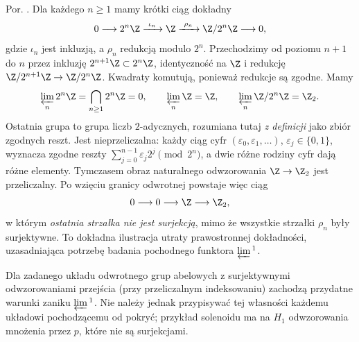 \begin{przyklad}
\label{prz:cech-lim-niedokladnosc}
Por. .
Dla każdego $n\ge1$ mamy krótki ciąg dokładny
\[
 0\longrightarrow 2^n\Z
 \xrightarrow{\ \iota_n\ }\Z
 \xrightarrow{\ \rho_n\ }\Z/2^n\Z
 \longrightarrow0,
\]
gdzie $\iota_n$ jest inkluzją, a $\rho_n$
redukcją modulo $2^n$.
Przechodzimy od poziomu $n+1$ do $n$ przez
inkluzję $2^{n+1}\Z\subset2^n\Z$,
identyczność na $\Z$ i redukcję
$\Z/2^{n+1}\Z\to\Z/2^n\Z$.
Kwadraty komutują, ponieważ redukcje są zgodne.
Mamy
\[
 \varprojlim_n2^n\Z=\bigcap_{n\ge1}2^n\Z=0,
 \qquad
 \varprojlim_n\Z=\Z,\qquad
 \varprojlim_n\Z/2^n\Z=\Z_2.
\]
Ostatnia grupa to grupa liczb $2$-adycznych,
rozumiana tutaj \emph{z definicji} jako zbiór
zgodnych reszt. Jest nieprzeliczalna:
każdy ciąg cyfr $(\varepsilon_0,\varepsilon_1,\ldots)$,
$\varepsilon_j\in\{0,1\}$, wyznacza zgodne reszty
$\sum_{j=0}^{n-1}\varepsilon_j2^j\pmod{2^n}$,
a dwie różne rodziny cyfr dają różne elementy.
Tymczasem obraz naturalnego odwzorowania
$\Z\to\Z_2$ jest przeliczalny.
Po wzięciu granicy odwrotnej powstaje więc
ciąg
\[
 0\longrightarrow0\longrightarrow\Z
 \longrightarrow\Z_2,
\]
w którym \emph{ostatnia strzałka nie jest surjekcją},
mimo że wszystkie strzałki $\rho_n$ były surjektywne.
To dokładna ilustracja utraty prawostronnej
dokładności, uzasadniająca potrzebę badania
pochodnego funktora $\varprojlim{}^1$.
\end{przyklad}

\begin{uwaga}
Dla zadanego układu odwrotnego grup abelowych z
surjektywnymi odwzorowaniami przejścia (przy przeliczalnym
indeksowaniu) zachodzą przydatne warunki zaniku
$\varprojlim{}^1$. Nie należy jednak przypisywać tej
własności każdemu układowi pochodzącemu od pokryć;
przykład solenoidu ma na $H_1$ odwzorowania mnożenia przez $p$,
które nie są surjekcjami.
\end{uwaga}
\clearpage

